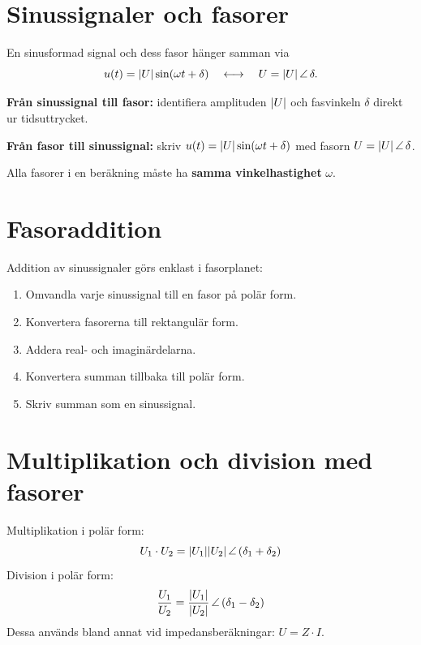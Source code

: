 
\section{Sinussignaler och fasorer}
\label{c17:sec:fasorer}
En sinusformad signal och dess fasor hänger samman via
\[
  u(t) = \lvert U\rvert\sin(\omega t + \delta) \quad \longleftrightarrow \quad U = \lvert U\rvert\,\angle\,\delta.
\]

\textbf{Från sinussignal till fasor:} identifiera amplituden $\lvert U\rvert$ och fasvinkeln $\delta$
direkt ur tidsuttrycket.

\textbf{Från fasor till sinussignal:} skriv $u(t) = \lvert U\rvert\sin(\omega t + \delta)$ med fasorn
$U = \lvert U\rvert\,\angle\,\delta$.

\begin{aside}
\note[Obs] Alla fasorer i en beräkning måste ha \textbf{samma vinkelhastighet} $\omega$.
\end{aside}

\section{Fasoraddition}
\label{c17:sec:fasoraddition}
Addition av sinussignaler görs enklast i fasorplanet:
\begin{enumerate}
  \item Omvandla varje sinussignal till en fasor på polär form.
  \item Konvertera fasorerna till rektangulär form.
  \item Addera real- och imaginärdelarna.
  \item Konvertera summan tillbaka till polär form.
  \item Skriv summan som en sinussignal.
\end{enumerate}

\section{Multiplikation och division med fasorer}
\label{c17:sec:multiplikation}
Multiplikation i polär form:
\[
  U_1 \cdot U_2 = \lvert U_1\rvert\lvert U_2\rvert\,\angle\,(\delta_1 + \delta_2)
\]
Division i polär form:
\[
  \frac{U_1}{U_2} = \frac{\lvert U_1\rvert}{\lvert U_2\rvert}\,\angle\,(\delta_1 - \delta_2)
\]
Dessa används bland annat vid impedansberäkningar: $U = Z \cdot I$.

